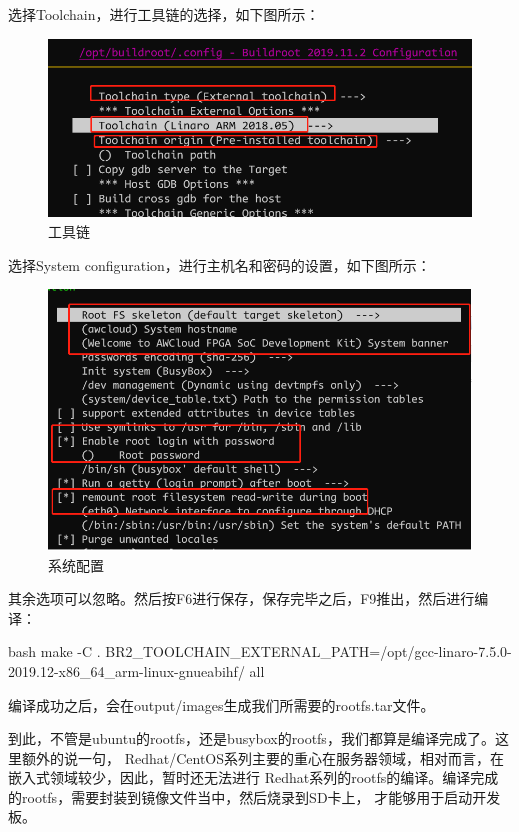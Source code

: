选择Toolchain，进行工具链的选择，如下图所示：
\begin{figure}[H]
  \centering
  \includegraphics[width=\linewidth]{toolchain.png}
  \caption{工具链}
  \label{fig:toolchain}
\end{figure}

选择System configuration，进行主机名和密码的设置，如下图所示：
\begin{figure}[H]
  \centering
  \includegraphics[width=\linewidth]{sys_config.png}
  \caption{系统配置}
  \label{fig:sys_config}
\end{figure}

其余选项可以忽略。然后按F6进行保存，保存完毕之后，F9推出，然后进行编译：
\begin{code-block}{bash}
make -C . BR2_TOOLCHAIN_EXTERNAL_PATH=/opt/gcc-linaro-7.5.0-2019.12-x86_64_arm-linux-gnueabihf/ all
\end{code-block}
编译成功之后，会在output/images生成我们所需要的rootfs.tar文件。

到此，不管是ubuntu的rootfs，还是busybox的rootfs，我们都算是编译完成了。这里额外的说一句，
Redhat/CentOS系列主要的重心在服务器领域，相对而言，在嵌入式领域较少，因此，暂时还无法进行
Redhat系列的rootfs的编译。编译完成的rootfs，需要封装到镜像文件当中，然后烧录到SD卡上，
才能够用于启动开发板。

